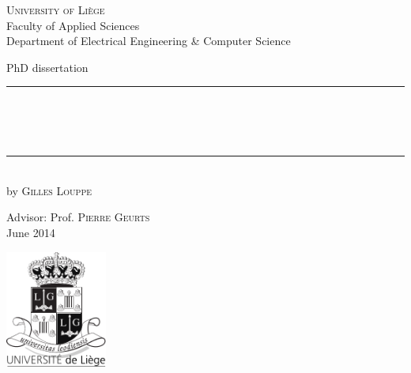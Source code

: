 
\begin{titlepage}
	\begin{addmargin}[-1cm]{-3cm}
    \begin{center}
        \large
        \textsc{University of Li{\`e}ge} \\
        Faculty of Applied Sciences\\
        Department of Electrical Engineering \& Computer Science\\

        \vfill

        PhD dissertation\\ \vskip1cm
        \rule{14cm}{0.4pt}\\ \bigskip
        \begingroup
            \Large
            \color{Maroon}\spacedallcaps{\myTitle} \\ \bigskip
        \endgroup
        \spacedlowsmallcaps{\mySubtitle} \\ \bigskip
        \rule{14cm}{0.4pt}\\ \vskip1cm
        by \textsc{Gilles Louppe}

        \vfill
        \vfill
        \vfill

        \hfill Advisor: Prof. \textsc{Pierre Geurts}\\
        \hfill June 2014
    \end{center}
    \vspace{-3.5cm}\includegraphics[width=0.25\textwidth]{figures/blason.pdf}
  \end{addmargin}
\end{titlepage}
